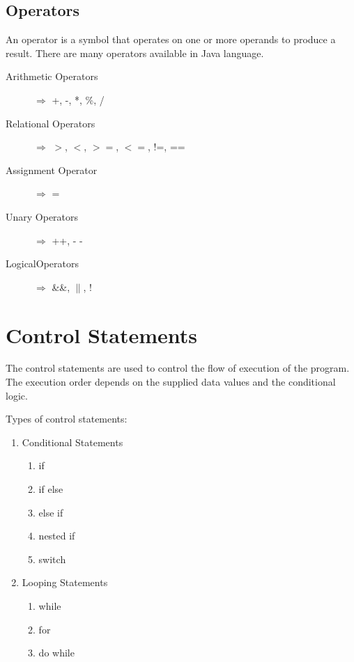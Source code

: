 \documentclass[11pt,a4paper]{article}
\begin{document}
\subsection*{Operators}
An operator is a symbol that operates on one or more operands to produce a result. There are many operators available in Java language.
\begin{description}
\item [Arithmetic Operators] $\Longrightarrow$ +, -, *, \%, /
\item [Relational Operators] $\Longrightarrow$  $>$, $<$, $>=$, $<=$, !=, ==
\item [Assignment Operator] $\Longrightarrow$  =
\item [Unary Operators]  $\Longrightarrow$ ++, - -
\item [LogicalOperators] $\Longrightarrow$ \&\&, $\parallel$, ! 
\end{description}

\section*{Control Statements}
The control statements are used to control the flow of execution of the program. The execution order depends on the supplied data values and the conditional logic.

Types of control statements:

\begin{enumerate}
 \item	Conditional Statements
 \begin{enumerate}
  \item if
  \item if else
  \item else if
  \item nested if
  \item switch
 \end{enumerate}
 \item	Looping Statements
 \begin{enumerate}
  \item while
  \item for
  \item do while
 \end{enumerate}
\end{enumerate}
\end{document}
